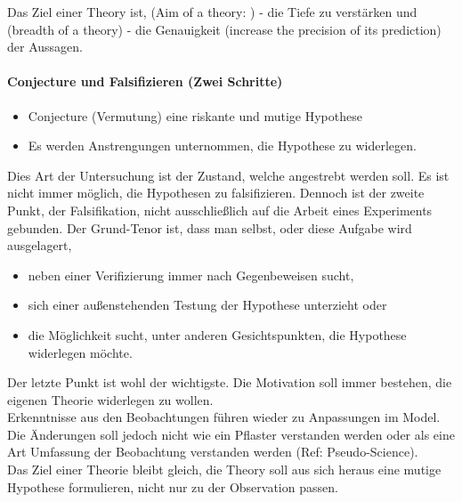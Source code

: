 Das Ziel einer Theory ist, (Aim of a theory: )
- die Tiefe zu verstärken und (breadth of a theory)
- die Genauigkeit (increase the precision of its prediction) 
der Aussagen.


\paragraph{Conjecture und Falsifizieren (Zwei Schritte)} 
\begin{itemize}
	\item Conjecture (Vermutung) eine riskante und mutige Hypothese
	\item Es werden Anstrengungen unternommen, die Hypothese zu widerlegen.
\end{itemize}

Dies Art der Untersuchung ist der Zustand, welche angestrebt werden soll. Es ist nicht immer möglich, die Hypothesen zu falsifizieren. Dennoch ist der zweite Punkt, der Falsifikation, nicht ausschließlich auf die Arbeit eines Experiments gebunden. Der Grund-Tenor ist, dass man selbst, oder diese Aufgabe wird ausgelagert, 
\begin{itemize}
	\item neben einer Verifizierung immer nach Gegenbeweisen sucht,
	\item sich einer außenstehenden Testung der Hypothese unterzieht oder
	\item die Möglichkeit sucht, unter anderen Gesichtspunkten, die Hypothese widerlegen möchte.
\end{itemize}

Der letzte Punkt ist wohl der wichtigste. Die Motivation soll immer bestehen, die eigenen Theorie widerlegen zu wollen.\\

Erkenntnisse aus den Beobachtungen führen wieder zu Anpassungen im Model. Die Änderungen soll jedoch nicht wie ein Pflaster verstanden werden oder als eine Art Umfassung der Beobachtung verstanden werden (Ref: Pseudo-Science).\\ 

Das Ziel einer Theorie bleibt gleich, die Theory soll aus sich heraus eine mutige Hypothese formulieren, nicht nur zu der Observation passen.



